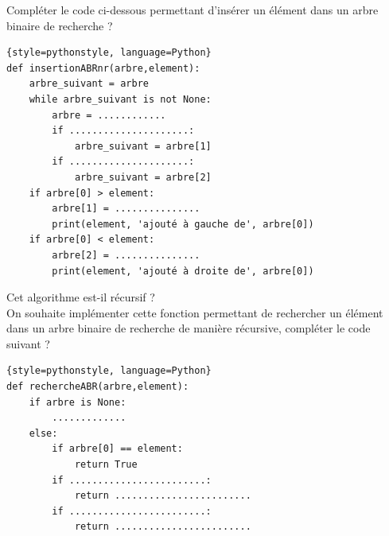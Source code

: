 \begin{Exercise}[title={A la recherche du logarithme}]

\Question Compléter le code ci-dessous permettant d'insérer un élément dans un arbre binaire de recherche ?\\
\begin{lstlisting}{style=pythonstyle, language=Python}
def insertionABRnr(arbre,element):
    arbre_suivant = arbre
    while arbre_suivant is not None:
        arbre = ............
        if .....................:
            arbre_suivant = arbre[1]
        if .....................:
            arbre_suivant = arbre[2]
    if arbre[0] > element:
        arbre[1] = ...............
        print(element, 'ajouté à gauche de', arbre[0])
    if arbre[0] < element:
        arbre[2] = ...............
        print(element, 'ajouté à droite de', arbre[0])
\end{lstlisting}

\Question Cet algorithme est-il récursif ?\\

\Question On souhaite implémenter cette fonction permettant de rechercher un élément dans un arbre binaire de recherche de manière récursive, compléter le code suivant ?\\
\begin{lstlisting}{style=pythonstyle, language=Python}
def rechercheABR(arbre,element):
    if arbre is None:
        .............
    else:
        if arbre[0] == element:
            return True
        if ........................:
            return ........................
        if ........................:
            return ........................
\end{lstlisting}
\end{Exercise}
\pagebreak